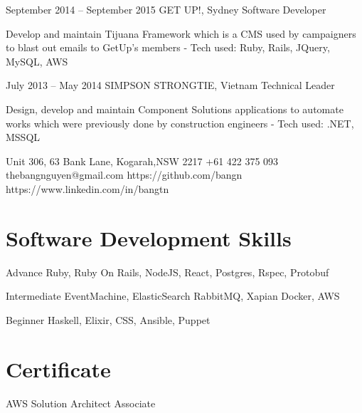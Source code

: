 \documentclass{tccv}
\begin{document}
\begin{eventlist}
\item{September 2014 -- September 2015}
    {GET UP!, Sydney}
    {Software Developer}

    Develop and maintain Tijuana Framework which is a CMS
    used by campaigners to blast out emails to GetUp's members
    \newline- Tech used: Ruby, Rails, JQuery, MySQL, AWS

\item{July 2013 -- May 2014}
    {SIMPSON STRONGTIE, Vietnam}
    {Technical Leader}

    Design, develop and maintain Component Solutions applications to automate
    works which were previously done by construction engineers
    \newline- Tech used: .NET, MSSQL

\end{eventlist}

\personal
    {Unit 306, 63 Bank Lane, Kogarah,\newline NSW 2217}
    {+61 422 375 093}
    {thebangnguyen@gmail.com}
    {https://github.com/bangn}
    {https://www.linkedin.com/in/bangtn}

\section{Software Development Skills}

\begin{factlist}

\item{Advance}
    {Ruby, Ruby On Rails, NodeJS, React, Postgres, Rspec, Protobuf}

\item{Intermediate}
    {EventMachine, ElasticSearch
    \newline RabbitMQ, Xapian
    \newline Docker, AWS}

\item{Beginner}
    {Haskell, Elixir, CSS, Ansible, Puppet}
\end{factlist}

\section{Certificate}

\begin{factlist}

\item{AWS Solution Architect}
    {Associate}

\end{factlist}
\end{document}
